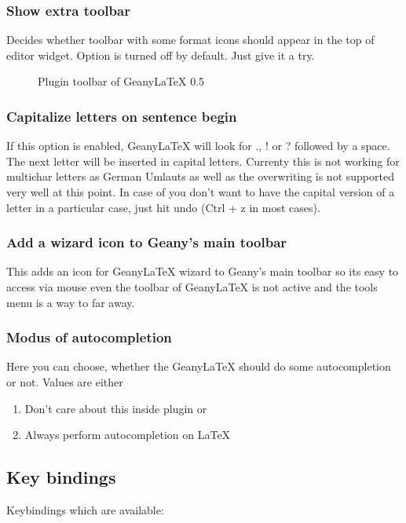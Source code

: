 \documentclass[%
paper=a4,%
fontsize=11pt,%
twoside=false,%
DIV18,%
headsepline,%
plainheadsepline,%
footsepline,%
plainfootsepline,%
bibliography=totoc,%
listof=totoc,%
BCOR10mm,%
parskip=half,%
openany,%
]{scrartcl}
\begin{document}
\subsubsection{Show extra toolbar}
Decides whether toolbar with some format icons should appear in the top
of editor widget. Option is turned off by default. Just give it a try.

\begin{figure}[h!]
	\caption{Plugin toolbar of Geany\LaTeX{} 0.5}
\end{figure}


\subsubsection{Capitalize letters on sentence begin}

If this option is enabled, Geany\LaTeX{} will look for \textsc{.},
\textsc{!} or \textsc{?} followed by a space. The next letter will
be inserted in capital letters. Currenty this is not working for
multichar letters as German Umlauts as well as the overwriting is
not supported very well at this point. In case of you don't want to
have the capital version of a letter in a particular case, just hit
undo (Ctrl + z in most cases).

\subsubsection{Add a wizard icon to Geany's main toolbar}
This adds an icon for Geany\LaTeX{} wizard to Geany's main toolbar
so its easy to access via mouse even the toolbar of Geany\LaTeX{} is
not active and the tools menu is a way to far away.

\subsubsection{Modus of autocompletion}
\label{sec:modus_of_autocompletion}
Here you can choose, whether the Geany\LaTeX{} should do some
autocompletion or not. Values are either
\begin{enumerate}
	\item Don't care about this inside plugin or
	\item Always perform autocompletion on LaTeX
\end{enumerate}

\subsection{Key bindings}
\label{sec:key_bindings}
Keybindings which are available:
\end{document}

